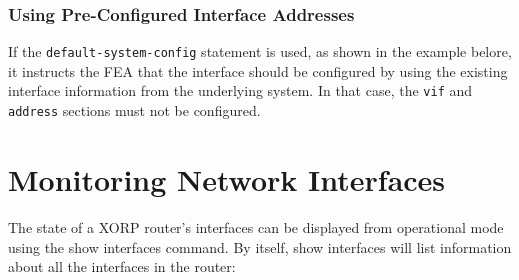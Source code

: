 \subsubsection{Using Pre-Configured Interface Addresses}

If the {\tt default-system-config} statement is used, as shown in the
example belore, it instructs the FEA that the interface should be
configured by using the existing interface information from the
underlying system.  In that case, the {\tt vif} and {\tt address}
sections must not be configured.

\vspace{0.1in}
\noindent{}
\vspace{0.1in}


\newpage
\section{Monitoring Network Interfaces}

The state of a XORP router's interfaces can be displayed from
operational mode using the {\stt show interfaces} command.  By itself,
{\stt show interfaces} will list information about all the interfaces
in the router:


